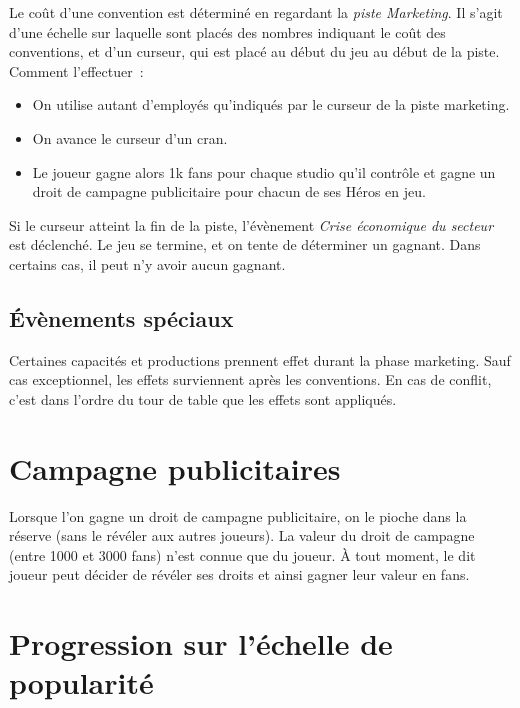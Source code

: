                 Le coût d'une convention est déterminé en regardant la \textit{piste Marketing}. Il s'agit
                d'une échelle sur laquelle sont placés des nombres indiquant le coût des conventions, et d'un
                curseur, qui est placé au début du jeu au début de la piste.
                \\
                Comment l'effectuer :
                    \begin{itemize}
                        \item On utilise autant d'employés qu'indiqués par le curseur de la piste marketing.
                        \item On avance le curseur d'un cran.
                        \item Le joueur gagne alors 1k fans pour chaque studio qu'il contrôle et gagne un droit de campagne publicitaire pour chacun de ses Héros en jeu.
                    \end{itemize}

                Si le curseur atteint la fin de la piste, l'évènement \textit{Crise économique du secteur} est déclenché.
                Le jeu se termine, et on tente de déterminer un gagnant. Dans certains cas, il peut n'y avoir aucun gagnant.

            \subsection{Évènements spéciaux}

                Certaines capacités et productions prennent effet durant la phase marketing.
                Sauf cas exceptionnel, les effets surviennent après les conventions.
                En cas de conflit, c'est dans l'ordre du tour de table que les effets sont appliqués.


        \section{Campagne publicitaires}

            Lorsque l'on gagne un droit de campagne publicitaire, on le pioche dans la réserve
            (sans le révéler aux autres joueurs). La valeur du droit de campagne (entre 1000 et 3000 fans)
            n'est connue que du joueur. À tout moment, le dit joueur peut décider de révéler ses
            droits et ainsi gagner leur valeur en fans.

        \section{Progression sur l'échelle de popularité}

